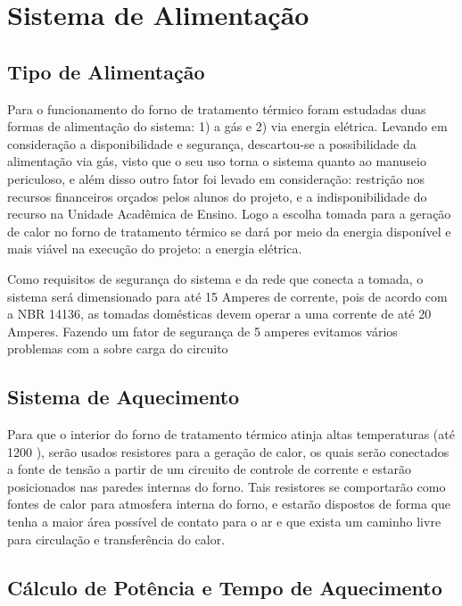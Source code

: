 \section{Sistema de Alimentação}

\subsection{Tipo de Alimentação}

Para o funcionamento do forno de tratamento térmico foram estudadas duas formas de alimentação do sistema: 1) a gás e 2) via energia elétrica. Levando em consideração a disponibilidade e segurança, descartou-se a possibilidade da alimentação via gás, visto que o seu uso torna o sistema quanto ao manuseio periculoso, e além disso outro fator foi levado em consideração: restrição nos recursos financeiros orçados pelos alunos do projeto, e a indisponibilidade do recurso na Unidade Acadêmica de Ensino. Logo a escolha tomada para a geração de calor no forno de tratamento térmico se dará por meio da energia disponível e mais viável na execução do projeto: a energia elétrica. 

Como requisitos de segurança do sistema e da rede que conecta a tomada, o sistema será dimensionado para até 15 Amperes de corrente, pois de acordo com a NBR 14136, as tomadas domésticas devem operar a uma corrente de até 20 Amperes. Fazendo um fator de segurança de 5 amperes evitamos vários problemas com a sobre carga do circuito

\subsection{Sistema de Aquecimento}

Para que o interior do forno de tratamento térmico atinja altas temperaturas (até 1200 ), serão usados resistores para a geração de calor, os quais serão conectados a fonte de tensão a partir de um circuito de controle de corrente e estarão posicionados nas paredes internas do forno. Tais resistores se comportarão como fontes de calor para atmosfera interna do forno, e estarão dispostos de forma que tenha a maior área possível de contato para o ar e que exista um caminho livre para circulação e transferência do calor.

\subsection{Cálculo de Potência e Tempo de Aquecimento}

